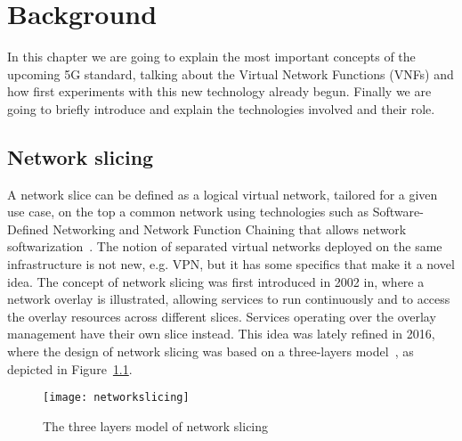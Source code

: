 \chapter{Background}
\label{chap:background}

In this chapter we are going to explain the most important concepts of the 
upcoming 5G standard, talking about the Virtual Network Functions (VNFs) and 
how first experiments with this new technology already begun. Finally we are 
going to briefly introduce and explain the technologies involved and their role.

\section{Network slicing}
A network slice can be defined as a logical virtual network, tailored for a
given use case, on the top a common network using technologies such as
Software-Defined Networking and Network Function Chaining that allows network
softwarization~\cite{ordonez2017network}. The notion of separated virtual
networks deployed on the same infrastructure is not new, e.g. VPN, but it has
some specifics that make it a novel idea. The concept of network slicing was
first introduced in 2002 in\cite{peterson2003blueprint}, where a network 
overlay is illustrated, allowing services to run continuously and to access the 
overlay resources across different slices. Services operating over the overlay 
management have their own slice instead. This idea was lately refined in 2016, 
where the design of network slicing was based on a three-layers 
model~\cite{alliance2016description}, as depicted in 
Figure~\ref{chap:background:img:network_slicing}.

\begin{figure}
  \centering
  \texttt{[image: networkslicing]}
  \caption{The three layers model of network slicing}
  \label{chap:background:img:network_slicing}
\end{figure}

